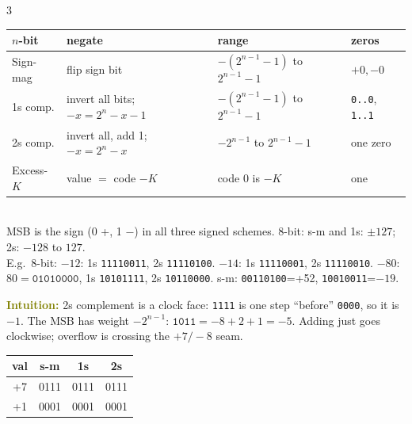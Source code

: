 \documentclass[landscape]{article}
\newcommand{\idea}[1]{\par\noindent\colorbox{yellow!25}{\parbox{\dimexpr\linewidth-2\fboxsep}{\textcolor{olive}{\textbf{Intuition:} }#1}}\par}
\newcommand{\tc}[1]{\texttt{#1}}
\begin{document}
\begin{multicols*}{3}
\begin{tabular}{@{}p{34pt}p{68pt}p{84pt}p{38pt}@{}}\toprule
$n$-bit & negate & range & zeros\\\midrule
Sign-mag & flip sign bit & $-(2^{n-1}-1)$ to $2^{n-1}-1$ & $+0,-0$\\
1s comp. & invert all bits; $-x=2^n-x-1$ & $-(2^{n-1}-1)$ to $2^{n-1}-1$ & \tc{0..0}, \tc{1..1}\\
2s comp. & invert all, add 1; $-x=2^n-x$ & $-2^{n-1}$ to $2^{n-1}-1$ & one zero\\
Excess-$K$ & value $=$ code $-K$ & code 0 is $-K$ & one\\\bottomrule
\end{tabular}\\
MSB is the sign (0 +, 1 $-$) in all three signed schemes. 8-bit: s-m and 1s: $\pm127$; 2s: $-128$ to $127$.\\
E.g.\ 8-bit: $-12$: 1s \tc{11110011}, 2s \tc{11110100}. $-14$: 1s \tc{11110001}, 2s \tc{11110010}. $-80$: $80=\tc{01010000}$, 1s \tc{10101111}, 2s \tc{10110000}. s-m: \tc{00110100}=+52, \tc{10010011}=$-19$.\\
\idea{2s complement is a clock face: \tc{1111} is one step ``before'' \tc{0000}, so it is $-1$. The MSB has weight $-2^{n-1}$: $\tc{1011}=-8+2+1=-5$. Adding just goes clockwise; overflow is crossing the $+7/-8$ seam.}
\begin{center}
\hspace{4pt}
\begin{tabular}[b]{@{}c|ccc@{}}
val & s-m & 1s & 2s\\\hline
+7 & 0111&0111&0111\\
+1 & 0001&0001&0001\\

\end{tabular}
\end{center}
\end{multicols*}
\end{document}
